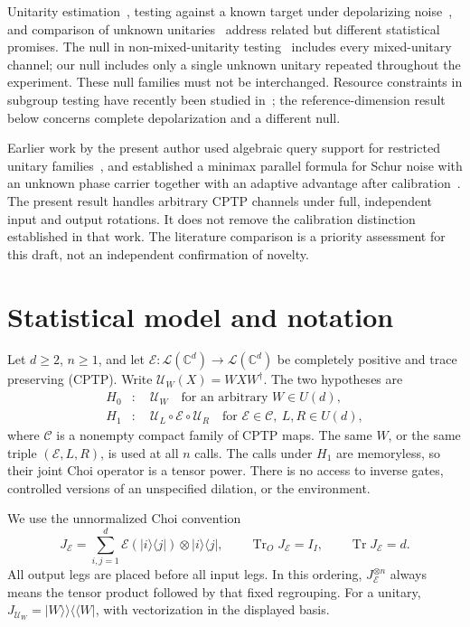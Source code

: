 \documentclass[11pt,a4paper]{article}
\theoremstyle{remark}\newtheorem{remark}[theorem]{Remark}
\DeclareMathOperator{\Tr}{Tr}
\newcommand{\cE}{\mathcal E}
\newcommand{\cU}{\mathcal U}
\newcommand{\cC}{\mathcal C}
\newcommand{\ket}[1]{\lvert #1\rangle}
\newcommand{\bra}[1]{\langle #1\rvert}
\newcommand{\dket}[1]{\lvert #1\rangle\!\rangle}
\newcommand{\dbra}[1]{\langle\!\langle #1\rvert}
\newcommand{\bbC}{\mathbb C}
\begin{document}
Unitarity estimation~\cite{chen_unitarity}, testing against a known target under depolarizing noise~\cite{ghosh}, and comparison of unknown unitaries~\cite{hashimoto} address related but different statistical promises. The null in non-mixed-unitarity testing~\cite{ghosal} includes every mixed-unitary channel; our null includes only a single unknown unitary repeated throughout the experiment. These null families must not be interchanged. Resource constraints in subgroup testing have recently been studied in~\cite{cao}; the reference-dimension result below concerns complete depolarization and a different null.

Earlier work by the present author used algebraic query support for restricted unitary families~\cite{eriksson_support}, and established a minimax parallel formula for Schur noise with an unknown phase carrier together with an adaptive advantage after calibration~\cite{eriksson_phase}. The present result handles arbitrary CPTP channels under full, independent input and output rotations. It does not remove the calibration distinction established in that work. The literature comparison is a priority assessment for this draft, not an independent confirmation of novelty.

\section{Statistical model and notation}
Let $d\geq2$, $n\geq1$, and let $\cE:\mathcal L(\bbC^d)\to\mathcal L(\bbC^d)$ be completely positive and trace preserving (CPTP). Write $\cU_W(X)=WXW^\dagger$. The two hypotheses are
\begin{align}
 H_0&:\quad \cU_W \quad\text{for an arbitrary }W\in U(d),\label{eq:null}\\
 H_1&:\quad \cU_L\circ\cE\circ\cU_R
 \quad\text{for }\cE\in\cC,\ L,R\in U(d),\label{eq:alt}
\end{align}
where $\cC$ is a nonempty compact family of CPTP maps. The same $W$, or the same triple $(\cE,L,R)$, is used at all $n$ calls. The calls under $H_1$ are memoryless, so their joint Choi operator is a tensor power. There is no access to inverse gates, controlled versions of an unspecified dilation, or the environment.

We use the unnormalized Choi convention
\begin{equation}
 J_{\cE}=\sum_{i,j=1}^d\cE(\ket i\bra j)\otimes\ket i\bra j,
 \qquad \Tr_OJ_{\cE}=I_I,\qquad \Tr J_{\cE}=d.
\end{equation}
All output legs are placed before all input legs. In this ordering, $J_{\cE}^{\otimes n}$ always means the tensor product followed by that fixed regrouping. For a unitary, $J_{\cU_W}=\dket W\dbra W$, with vectorization in the displayed basis.
\end{document}

